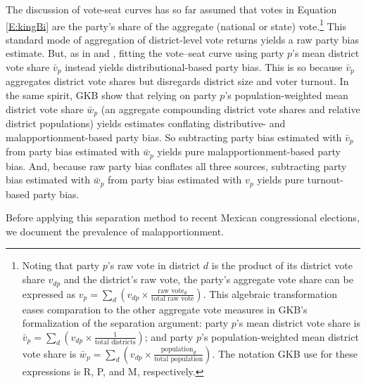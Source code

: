 \documentclass[letter,12pt]{article}
\begin{document}
The discussion of vote-seat curves has so far assumed that votes in Equation \ref{E:kingBi} are the party's share of the aggregate (national or state) vote.\footnote{Noting that party $p$'s raw vote in district $d$ is the product of its district vote share $v_{dp}$ and the district's raw vote, the party's aggregate vote share can be expressed as $v_p = \sum_d (v_{dp} \times \frac{\text{raw vote}_d}{\text{total raw vote}})$. This algebraic transformation eases comparation to the other aggregate vote measures in GKB's formalization of the separation argument: party $p$'s mean district vote share is $\bar{v}_p = \sum_d (v_{dp} \times \frac{1}{\text{total districts}})$; and party $p$'s population-weighted mean district vote share is $\bar{w}_p = \sum_d (v_{dp} \times \frac{\text{population}_d}{\text{total population}})$. The notation GKB use for these expressions is R, P, and M, respectively.} This standard mode of aggregation of district-level vote returns yields a raw party bias estimate. But, as in \citet{tufte1973seatsVotes} and \citet{gelman.king.1994EvalElSysRedis}, fitting the vote--seat curve using party $p$'s mean district vote share $\bar{v}_p$ instead yields distributional-based party bias. This is so because $\bar{v}_p$ aggregates district vote shares but disregards district size and voter turnout. In the same spirit, GKB show that relying on party $p$'s population-weighted mean district vote share $\bar{w}_p$ (an aggregate compounding district vote shares and relative district populations) yields estimates conflating distributive- and malapportionment-based party bias. So subtracting party bias estimated with $\bar{v}_p$ from party bias estimated with $\bar{w}_p$ yields pure malapportionment-based party bias. And, because raw party bias conflates all three sources, subtracting party bias estimated with $\bar{w}_p$ from party bias estimated with $v_p$ yields pure turnout-based party bias. 



Before applying this separation method to recent Mexican congressional elections, we document the prevalence of malapportionment. 
\end{document}
